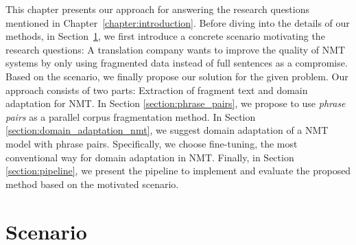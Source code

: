 This chapter presents our approach for answering the research questions mentioned in Chapter~\ref{chapter:introduction}. Before diving into the details of our methods, in Section~\ref{section:scenario}, we first introduce a concrete scenario motivating the research questions: A translation company wants to improve the quality of NMT systems by only using fragmented data instead of full sentences as a compromise.
Based on the scenario, we finally propose our solution for the given problem. Our approach consists of two parts: Extraction of fragment text and domain adaptation for NMT. In Section \ref{section:phrase_pairs}, we propose to use \textit{phrase pairs} as a parallel corpus fragmentation method. %
In Section \ref{section:domain_adaptation_nmt}, we suggest domain adaptation of a NMT model with phrase pairs. Specifically, we choose fine-tuning, the most conventional way for domain adaptation in NMT. Finally, in Section \ref{section:pipeline}, we present the pipeline to implement and evaluate the proposed method based on the motivated scenario. 


\section{Scenario}\label{section:scenario}


